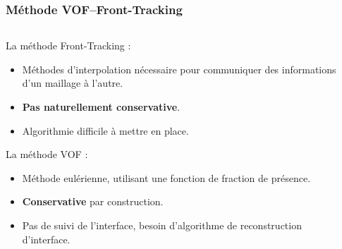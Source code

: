 \documentclass{beamer}
\begin{document}
\begin{frame}
    \frametitle{Méthode VOF--Front-Tracking}
    \scriptsize
    \begin{columns}[c]
    \begin{column}{0.6 \textwidth}
    \begin{ceablock}{La méthode Front-Tracking :}
        \begin{itemize}
            \item Méthodes d'interpolation nécessaire pour communiquer des informations d'un maillage à l'autre.
            \item \textbf{Pas naturellement conservative}.
            \item Algorithmie difficile à mettre en place.
        \end{itemize}
    \end{ceablock}
\begin{ceablock}{La méthode VOF :}
        \begin{itemize}
            \item Méthode eulérienne, utilisant une fonction de fraction de présence.
            \item \textbf{Conservative} par construction.
            \item Pas de suivi de l'interface, besoin d'algorithme de reconstruction d'interface.
            
        \end{itemize}
    \end{ceablock}
\end{column}
\begin{column}{0.4 \textwidth}
\begin{center}
		\begin{tikzpicture}[scale = 0.4, every node/.style={scale=0.4}]
			
		\end{tikzpicture}

\end{center}
\begin{center}
		\begin{tikzpicture}[scale = 0.4, every node/.style={scale=0.4}]
			
		\end{tikzpicture}

\end{center}
\end{column}
\end{columns}
\end{frame}
\end{document}
